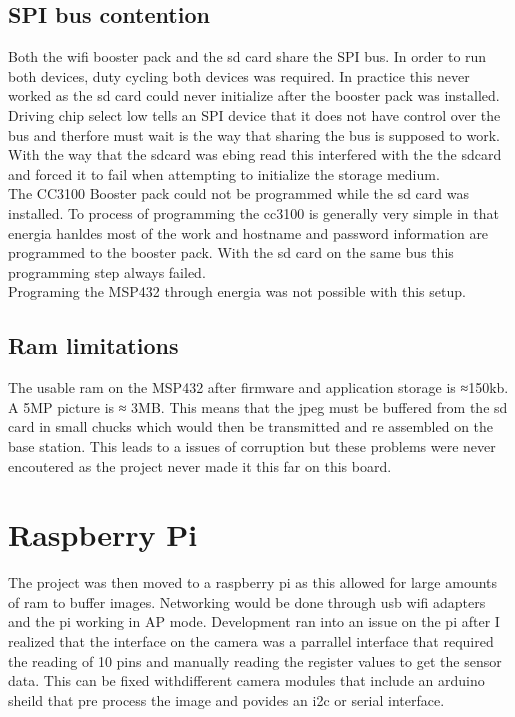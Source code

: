 \documentclass{article}
\begin{document}
 \subsection{SPI bus contention}
 Both the wifi booster pack and the sd card share the SPI bus. In order to run both devices, duty cycling both devices was required. In practice this never worked as the sd card could never initialize after the booster pack was installed. Driving chip select low tells an SPI device that it does not have control over the bus and therfore must wait is the  way that sharing the bus is supposed to work. With the way that the sdcard was ebing read this interfered with the the sdcard and forced it to fail when attempting to initialize the storage medium.\\
 The CC3100 Booster pack could not be programmed while the sd card was installed. To process of programming the cc3100 is generally very simple in that energia hanldes most of the work and hostname and password information are programmed to the booster pack. With the sd card on the same bus this programming step always failed.\\
 Programing the MSP432 through energia was not possible with this setup.

\subsection{Ram limitations}
The usable ram on the MSP432 after firmware and application storage is ≈150kb. A 5MP picture is ≈ 3MB. This means that the jpeg must be buffered from the sd card in small chucks which would then be transmitted and re assembled on the base station. This leads to a issues of corruption but these problems were never encoutered as the project never made it this far on this board.


\section{Raspberry Pi}
The project was then moved to a raspberry pi as this allowed for large amounts of ram to buffer images. Networking would be done through usb wifi adapters and the pi working in AP mode.
Development ran into an issue on the pi after I realized that the interface on the camera was a parrallel interface that required the reading of 10 pins and manually reading the register values to get the sensor data.
This can be fixed withdifferent camera modules that include an arduino sheild that pre process the image and povides an i2c or serial interface.
\end{document}
